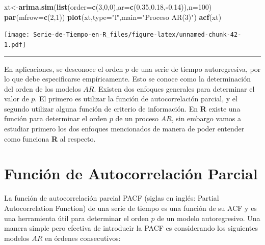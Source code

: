 \documentclass[12pt,]{krantz}
\makeatletter
\newenvironment{Shaded}{\begin{snugshade}}{\end{snugshade}}
\newcommand{\KeywordTok}[1]{\textcolor[rgb]{0.13,0.29,0.53}{\textbf{#1}}}
\newcommand{\DataTypeTok}[1]{\textcolor[rgb]{0.13,0.29,0.53}{#1}}
\newcommand{\DecValTok}[1]{\textcolor[rgb]{0.00,0.00,0.81}{#1}}
\newcommand{\FloatTok}[1]{\textcolor[rgb]{0.00,0.00,0.81}{#1}}
\newcommand{\StringTok}[1]{\textcolor[rgb]{0.31,0.60,0.02}{#1}}
\newcommand{\OperatorTok}[1]{\textcolor[rgb]{0.81,0.36,0.00}{\textbf{#1}}}
\newcommand{\NormalTok}[1]{#1}
\newenvironment{kframe}{%
\medskip{}
\setlength{\fboxsep}{.8em}
 \def\at@end@of@kframe{}%
 \ifinner\ifhmode%
  \def\at@end@of@kframe{\end{minipage}}%
  \begin{minipage}{\columnwidth}%
 \fi\fi%
 \def\FrameCommand##1{\hskip\@totalleftmargin \hskip-\fboxsep
 \colorbox{shadecolor}{##1}\hskip-\fboxsep
     \hskip-\linewidth \hskip-\@totalleftmargin \hskip\columnwidth}%
 \MakeFramed {\advance\hsize-\width
   \@totalleftmargin\z@ \linewidth\hsize
   \@setminipage}}%
 {\par\unskip\endMakeFramed%
 \at@end@of@kframe}
\renewenvironment{Shaded}{\begin{kframe}}{\end{kframe}}
\theoremstyle{definition}
\theoremstyle{definition}
\theoremstyle{definition}
\theoremstyle{remark}
\makeatother
\begin{document}
\begin{Shaded}
\begin{Highlighting}[]
\NormalTok{xt<-}\KeywordTok{arima.sim}\NormalTok{(}\KeywordTok{list}\NormalTok{(}\DataTypeTok{order=}\KeywordTok{c}\NormalTok{(}\DecValTok{3}\NormalTok{,}\DecValTok{0}\NormalTok{,}\DecValTok{0}\NormalTok{),}\DataTypeTok{ar=}\KeywordTok{c}\NormalTok{(}\FloatTok{0.35}\NormalTok{,}\FloatTok{0.18}\NormalTok{,}\OperatorTok{-}\FloatTok{0.14}\NormalTok{)),}\DataTypeTok{n=}\DecValTok{100}\NormalTok{)}
\KeywordTok{par}\NormalTok{(}\DataTypeTok{mfrow=}\KeywordTok{c}\NormalTok{(}\DecValTok{2}\NormalTok{,}\DecValTok{1}\NormalTok{))}
\KeywordTok{plot}\NormalTok{(xt,}\DataTypeTok{type=}\StringTok{"l"}\NormalTok{,}\DataTypeTok{main=}\StringTok{"Proceso AR(3)"}\NormalTok{)}
\KeywordTok{acf}\NormalTok{(xt)}
\end{Highlighting}
\end{Shaded}

\texttt{[image: Serie-de-Tiempo-en-R\_files/figure-latex/unnamed-chunk-42-1.pdf]}

\begin{center}\rule{0.5\linewidth}{\linethickness}\end{center}

En aplicaciones, se desconoce el orden \(p\) de una serie de tiempo
autoregresiva, por lo que debe especificarse empíricamente. Esto se
conoce como la determinación del orden de los modelos \(AR\). Existen
dos enfoques generales para determinar el valor de \(p\). El primero es
utilizar la función de autocorrelación parcial, y el segundo utilizar
alguna función de criterio de información. En \textbf{R} existe una
función para determinar el orden \(p\) de un proceso \(AR\), sin embargo
vamos a estudiar primero los dos enfoques mencionados de manera de poder
entender como funciona \textbf{R} al respecto.

\section{Función de Autocorrelación
Parcial}\label{funcion-de-autocorrelacion-parcial}

La función de autocorrelación parcial PACF (siglas en inglés: Partial
Autocorrelation Function) de una serie de tiempo es una función de su
ACF y es una herramienta útil para determinar el orden \(p\) de un
modelo autoregresivo. Una manera simple pero efectiva de introducir la
PACF es considerando los siguientes modelos \(AR\) en órdenes
consecutivos:
\end{document}
